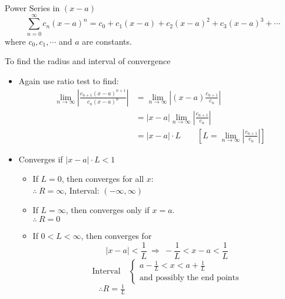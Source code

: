 \documentclass[12pt,a4paper]{article}
\begin{document}
\begin{df}{Power Series in $(x-a)$}
	$$\sum_{n=0}^\infty c_n(x-a)^n=c_0+c_1(x-a)+c_2(x-a)^2+c_3(x-a)^3+\cdots$$
	where $c_0, c_1, \cdots$ and $a$ are constants.	
\end{df}
\begin{thm}{To find the radius and interval of convergence}
	\begin{itemize}
		\item Again use ratio test to find: 
		$$\begin{aligned}
			\lim_{n\to\infty}\left|\frac{c_{n+1}(x-a)^{n+1}}{c_n(x-a)^n}\right|&=\lim_{n\to\infty}\left|(x-a)\frac{c_{n+1}}{c_n}\right|\\
			&=|x-a|\lim_{n\to\infty}\left|\frac{c_{n+1}}{c_n}\right|\\
			&=|x-a|\cdot L \qquad\left[L=\lim_{n\to\infty}\left|\frac{c_{n+1}}{c_n}\right|\right]
		\end{aligned}$$
		\item Converges if $|x-a|\cdot L<1$
		\begin{itemize}
			\item If $L=0$, then converges for all $x$: \\
			$\therefore\ R=\infty$, Interval: $(-\infty,\infty)$
			\item If $L=\infty$, then converges only if $x=a$.\\
			$\therefore\ R=0$
			\item If $0<L<\infty$, then converges for 
			$$|x-a|<\frac{1}{L}\ \Rightarrow\ -\frac{1}{L}<x-a<\frac{1}{L}$$
			$$\text{Interval}\quad\begin{cases}a-\frac{1}{L}<x<a+\frac{1}{L}\\\text{and possibly the end points}\end{cases}$$
			$\displaystyle\qquad\qquad\qquad\qquad\therefore R=\frac{1}{L}$
		\end{itemize}
	\end{itemize}
\end{thm}
\end{document}

